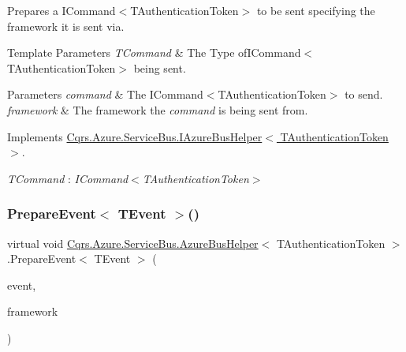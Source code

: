 Prepares a I\+Command$<$\+T\+Authentication\+Token$>$ to be sent specifying the framework it is sent via. 


\begin{DoxyTemplParams}{Template Parameters}
{\em T\+Command} & The Type ofI\+Command$<$\+T\+Authentication\+Token$>$ being sent.\\
\hline
\end{DoxyTemplParams}

\begin{DoxyParams}{Parameters}
{\em command} & The I\+Command$<$\+T\+Authentication\+Token$>$ to send.\\
\hline
{\em framework} & The framework the {\itshape command}  is being sent from.\\
\hline
\end{DoxyParams}


Implements \hyperlink{interfaceCqrs_1_1Azure_1_1ServiceBus_1_1IAzureBusHelper_ad25c4130a4357504cfccba49999493c7_ad25c4130a4357504cfccba49999493c7}{Cqrs.\+Azure.\+Service\+Bus.\+I\+Azure\+Bus\+Helper$<$ T\+Authentication\+Token $>$}.

\begin{Desc}
\item[Type Constraints]\begin{description}
\item[{\em T\+Command} : {\em I\+Command$<$T\+Authentication\+Token$>$}]\end{description}
\end{Desc}
\mbox{\label{classCqrs_1_1Azure_1_1ServiceBus_1_1AzureBusHelper_afb3ade39a8f8fd39c871c687701d80f4_afb3ade39a8f8fd39c871c687701d80f4}} 
\subsubsection{\texorpdfstring{Prepare\+Event$<$ T\+Event $>$()}{PrepareEvent< TEvent >()}}
{\footnotesize\ttfamily virtual void \hyperlink{classCqrs_1_1Azure_1_1ServiceBus_1_1AzureBusHelper}{Cqrs.\+Azure.\+Service\+Bus.\+Azure\+Bus\+Helper}$<$ T\+Authentication\+Token $>$.Prepare\+Event$<$ T\+Event $>$ (\begin{DoxyParamCaption}\item[{T\+Event @}]{event,  }\item[{string}]{framework }\end{DoxyParamCaption})\hspace{0.3cm}{\ttfamily [virtual]}}



